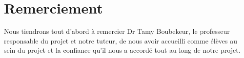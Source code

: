 \documentclass[a4paper,12pt]{article}
\def \ttprofname{Prof \textordmasculine.~Dr \textordmasculine.Tamy Boubekeur} %
\def \ttauthi{Tiago~Chedraoui~Silva} %
\def \ttdate{Juillet 25, 2013} %
\begin{document}
\thispagestyle{empty}
\titleTMB 


\newpage
\section*{Remerciement}
Nous tiendrons tout d’abord à remercier Dr Tamy Boubekeur, le
professeur responsable du projet et notre tuteur, de nous avoir
accueilli comme élèves au sein du projet et la confiance qu’il nous a
accordé tout au long de notre projet. 
\end{document}
